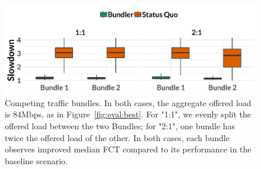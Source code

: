 \begin{figure}
    \centering
\begin{knitrout}
\color{fgcolor}
\includegraphics[width=\maxwidth]{figure/robust:twobundler-1} 

\end{knitrout}
    \caption{Competing traffic bundles. In both cases, the aggregate offered load is 84Mbps, as in Figure~\ref{fig:eval:best}. For "1:1", we evenly split the offered load between the two Bundles; for "2:1", one bundle has twice the offered load of the other. In both cases, each bundle observes improved median FCT compared to its performance in the baseline scenario.}
    \label{fig:robust:twobundler}
\end{figure}
